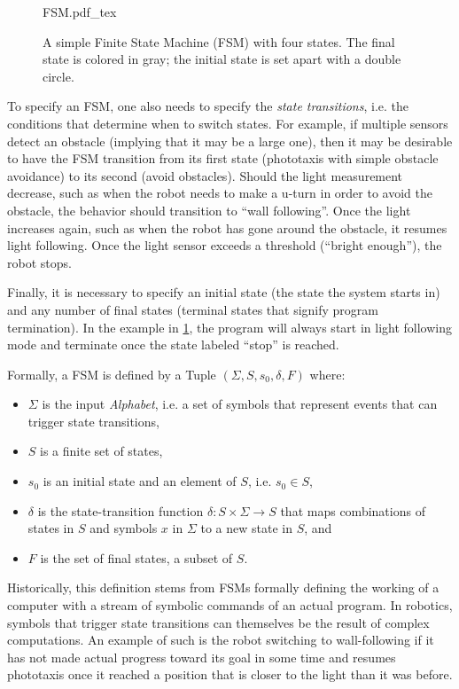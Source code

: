 \begin{figure}
\centering
    \small
    \def\svgwidth{0.9\textwidth}
    {FSM.pdf_tex}
\caption{A simple Finite State Machine (FSM) with four states. The final state is colored in gray; the initial state is set apart with a double circle.\label{fig:fsm}}
\end{figure}

To specify an FSM, one also needs to specify the \textsl{state transitions}, i.e. the conditions that determine when to switch states. For example, if multiple sensors detect an obstacle (implying that it may be a large one), then it may be desirable to have the FSM transition from its first state (phototaxis with simple obstacle avoidance) to its second (avoid obstacles). Should the light measurement decrease, such as when the robot needs to make a u-turn in order to avoid the obstacle, the behavior should transition to ``wall following''. Once the light increases again, such as when the robot has gone around the obstacle, it resumes light following. Once the light sensor exceeds a threshold (``bright enough''), the robot stops.

Finally, it is necessary to specify an initial state (the state the system starts in) and any number of final states (terminal states that signify program termination). In the example in \cref{fig:fsm}, the program will always start in light following mode and terminate once the state labeled ``stop'' is reached.

Formally, a FSM is defined by a Tuple $(\Sigma, S, s_0, \delta, F)$ where:
\begin{itemize}
\item $\Sigma$ is the input \textsl{Alphabet}, i.e. a set of symbols that represent events that can trigger state transitions,
\item $S$ is a finite set of states,
\item $s_0$ is an initial state and an element of $S$, i.e. $s_0 \in S$,
\item $\delta$ is the state-transition function $\delta: S \times \Sigma \rightarrow S$ that maps combinations of states in $S$ and symbols $x$ in $\Sigma$ to a new state in $S$, and
\item $F$ is the set of final states, a subset of $S$.
\end{itemize}

Historically, this definition stems from FSMs formally defining the working of a computer with a stream of symbolic commands of an actual program. In robotics, symbols that trigger state transitions can themselves be the result of complex computations. An example of such is the robot switching to wall-following if it has not made actual progress toward its goal in some time and resumes phototaxis once it reached a position that is closer to the light than it was before.

